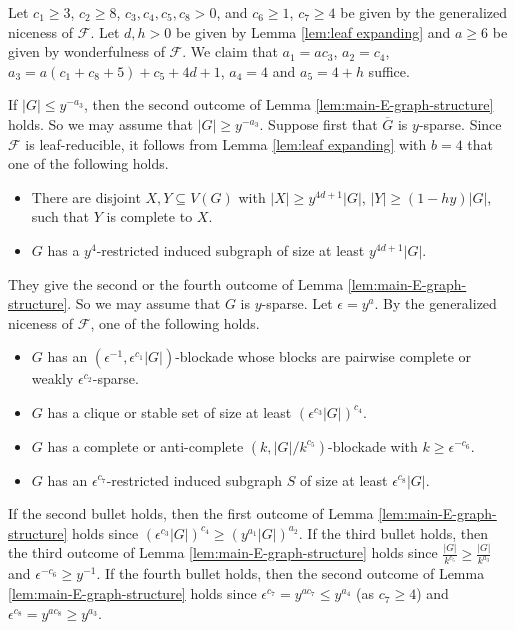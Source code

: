 \documentclass[a4paper,11pt]{article}
\let\oldendproof\endproof
\renewenvironment{proof}[1][\proofname]{%
	\oldproof[\normalfont\bfseries #1]%
}{\oldendproof}
\begin{document}
    \begin{proof}   
        Let $c_1\geq 3$, $c_2\geq 8$, $c_3,c_4,c_5,c_8>0$, and $c_6\geq 1$, $c_7\geq 4$ be given by the generalized niceness of $\mathcal{F}$. 
        Let $d,h>0$ be given by Lemma \ref{lem:leaf expanding} and $a\geq 6$ be given by wonderfulness of $\mathcal{F}$.  
        We claim that $a_1=ac_3$, $a_2=c_4$, $a_3=a(c_1+c_8+5)+c_5+4d+1$, $a_4=4$ and $a_5=4+h$ suffice. 

        If $|G|\leq y^{-a_3}$, then the second outcome of Lemma \ref{lem:main-E-graph-structure} holds. 
        So we may assume that $|G|\geq y^{-a_3}$. Suppose first that $\overline{G}$ is $y$-sparse. 
        Since $\mathcal{F}$ is leaf-reducible,
        it follows from Lemma \ref{lem:leaf expanding} with $b=4$ that one of the following holds.
        \begin{itemize}
            \item There are disjoint $X,Y\subseteq V(G)$ with $|X|\geq y^{4d+1}|G|$, $|Y|\geq (1-hy)|G|$, such that $Y$ is complete to $X$.
            
            \item $G$ has a $y^4$-restricted induced subgraph of size at least $y^{4d+1}|G|$.
        \end{itemize}
        They give the second or the fourth outcome of Lemma \ref{lem:main-E-graph-structure}. 
        So we may assume that $G$ is $y$-sparse. 
        Let $\epsilon=y^a$. 
        By the generalized niceness of $\mathcal{F}$, one of the following holds.  
        \begin{itemize}
            \item $G$ has an $(\epsilon^{-1},  \epsilon^{c_1}|G|)$-blockade whose blocks are pairwise complete or weakly $\epsilon^{c_2}$-sparse.

            \item $G$ has a clique or stable set of size at least $(\epsilon^{c_3}|G|)^{c_4}$.

            \item $G$ has a complete or anti-complete $(k,|G|/k^{c_5})$-blockade with $k\geq \epsilon^{-c_6}$.

            \item $G$ has an $\epsilon^{c_7}$-restricted induced subgraph $S$ of size at least $\epsilon^{c_8}|G|$.  
        \end{itemize}
        
        If the second bullet holds, then the first outcome of Lemma \ref{lem:main-E-graph-structure} holds since $(\epsilon^{c_3}|G|)^{c_4}\geq (y^{a_1}|G|)^{a_2}$. If the third bullet holds, then the third outcome of Lemma \ref{lem:main-E-graph-structure} holds since $\frac{|G|}{k^{c_5}}\geq  \frac{|G|}{k^{a_3}}$ and $\epsilon^{-c_6}\geq y^{-1}$. 
        If the fourth bullet holds, then the second outcome of Lemma \ref{lem:main-E-graph-structure} holds since $\epsilon^{c_7}=y^{ac_7}\leq y^{a_4}$ (as $c_7\ge 4$) and $\epsilon^{c_8}=y^{ac_8}\geq y^{a_3}$. 
        


\end{proof}
\end{document}
